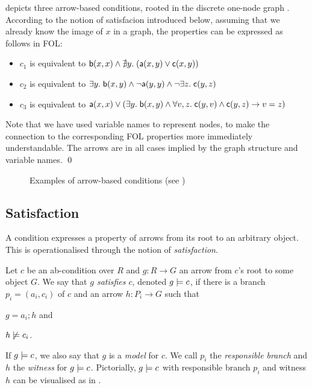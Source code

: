 \begin{example}
 depicts three arrow-based conditions, rooted in the discrete one-node graph . According
to the notion of satisfacion introduced below, assuming that we already know the image of $x$ in a graph, the properties can be expressed as follows in FOL:
\begin{itemize}
\item $c_1$ is equivalent to $\mathsf{b}(x,x)\wedge \nexists y.\;(\mathsf{a}(x,y)\vee \mathsf{c}(x,y))$
\item $c_2$ is equivalent to $\exists y.\; \mathsf{b}(x,y) \wedge \neg \mathsf{a}(y,y)\wedge \neg \exists z.\; \mathsf{c}(y,z)$ 
\item $c_3$ is equivalent to $\mathsf{a}(x,x)\vee (\exists y.\; \mathsf{b}(x,y) \wedge \forall v,z.\; \mathsf{c}(y,v)\wedge \mathsf{c}(y,z) \rightarrow v=z)$
\end{itemize}
%
Note that we have used variable names to represent nodes, to make the connection to the corresponding FOL properties more immediately understandable. The arrows are in all cases implied by the graph structure and variable names.
\qed
\end{example}

\begin{figure}[t]
\centering

\caption{Examples of arrow-based conditions (see )}
\end{figure}

\subsection{Satisfaction}

A condition expresses a property of arrows from its root to an arbitrary object. This is operationalised through the notion of \emph{satisfaction}.

\begin{definition}
  Let $c$ be an ab-condition over $R$ and $g:R\to G$ an arrow from $c$'s root to some object $G$. We say that \emph{$g$ satisfies $c$}, denoted $g\models c$, if there is a branch $p_i=(a_i,c_i)$ of $c$ and an arrow $h:P_i\to G$ such that
  \begin{enumerate*}
  \item $g=a_i;h$ and
  \item $h\not\models c_i$.
  \end{enumerate*}
\end{definition}
%
If $g\models c$, we also say that $g$ is a \emph{model} for $c$. We call $p_i$ the \emph{responsible branch} and $h$ the \emph{witness} for $g\models c$. Pictorially, $g\models c$ with responsible branch $p_i$ and witness $h$ can be visualised as in .

